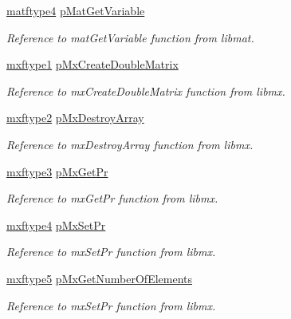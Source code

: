 \begin{DoxyCompactItemize}
\hyperlink{_matlab_library_8h_a19aaafe0b8eebabce596da80414ebe6e}{matftype4} \hyperlink{class_c_m_a_t_l_a_b_a67cb7321930f1e73b6b75a461c93316e}{p\-Mat\-Get\-Variable}
\begin{DoxyCompactList}\small\item\em Reference to mat\-Get\-Variable function from libmat. \end{DoxyCompactList}\item 
\hyperlink{_matlab_library_8h_a55b81c948c47f9bfd82db6232884abdd}{mxftype1} \hyperlink{class_c_m_a_t_l_a_b_a39b2341b32007df69682062513aeb208}{p\-Mx\-Create\-Double\-Matrix}
\begin{DoxyCompactList}\small\item\em Reference to mx\-Create\-Double\-Matrix function from libmx. \end{DoxyCompactList}\item 
\hyperlink{_matlab_library_8h_a7022359525610a30ebe4504fff8e3134}{mxftype2} \hyperlink{class_c_m_a_t_l_a_b_ac882abd9bca8e3568632f97f54ac419e}{p\-Mx\-Destroy\-Array}
\begin{DoxyCompactList}\small\item\em Reference to mx\-Destroy\-Array function from libmx. \end{DoxyCompactList}\item 
\hyperlink{_matlab_library_8h_a5c09a212f0d14401cca990067c9f1dbc}{mxftype3} \hyperlink{class_c_m_a_t_l_a_b_ab2647b823dd8a165c7109d0a927d457a}{p\-Mx\-Get\-Pr}
\begin{DoxyCompactList}\small\item\em Reference to mx\-Get\-Pr function from libmx. \end{DoxyCompactList}\item 
\hyperlink{_matlab_library_8h_af4399c0ac6b0e40881ea310c79348f66}{mxftype4} \hyperlink{class_c_m_a_t_l_a_b_a3da6fa87a95db825e0785f4abd761351}{p\-Mx\-Set\-Pr}
\begin{DoxyCompactList}\small\item\em Reference to mx\-Set\-Pr function from libmx. \end{DoxyCompactList}\item 
\hyperlink{_matlab_library_8h_a2b30bc63e1127ad09ffdcb6f160bd48f}{mxftype5} \hyperlink{class_c_m_a_t_l_a_b_ad4e70fa3e8a70bd9ca7bcf6c52b6e9c1}{p\-Mx\-Get\-Number\-Of\-Elements}
\begin{DoxyCompactList}\small\item\em Reference to mx\-Set\-Pr function from libmx. \end{DoxyCompactList}\item 

\end{DoxyCompactItemize}
